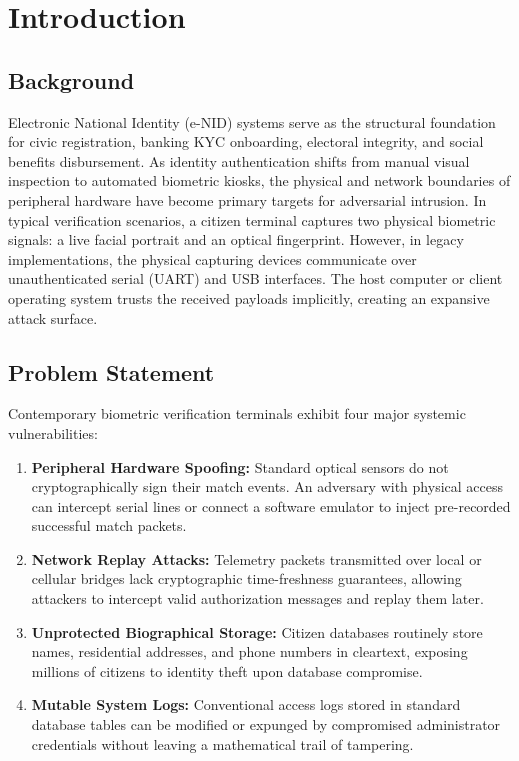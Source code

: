 \documentclass[11pt,a4paper]{article}
\begin{document}
\vspace{0.5cm}

\section{Introduction}

\subsection{Background}
Electronic National Identity (e-NID) systems serve as the structural foundation for civic registration, banking KYC onboarding, electoral integrity, and social benefits disbursement. As identity authentication shifts from manual visual inspection to automated biometric kiosks, the physical and network boundaries of peripheral hardware have become primary targets for adversarial intrusion. In typical verification scenarios, a citizen terminal captures two physical biometric signals: a live facial portrait and an optical fingerprint. However, in legacy implementations, the physical capturing devices communicate over unauthenticated serial (UART) and USB interfaces. The host computer or client operating system trusts the received payloads implicitly, creating an expansive attack surface.

\subsection{Problem Statement}
Contemporary biometric verification terminals exhibit four major systemic vulnerabilities:
\begin{enumerate}[label=\textbf{\arabic*.}]
    \item \textbf{Peripheral Hardware Spoofing:} Standard optical sensors do not cryptographically sign their match events. An adversary with physical access can intercept serial lines or connect a software emulator to inject pre-recorded successful match packets.
    \item \textbf{Network Replay Attacks:} Telemetry packets transmitted over local or cellular bridges lack cryptographic time-freshness guarantees, allowing attackers to intercept valid authorization messages and replay them later.
    \item \textbf{Unprotected Biographical Storage:} Citizen databases routinely store names, residential addresses, and phone numbers in cleartext, exposing millions of citizens to identity theft upon database compromise.
    \item \textbf{Mutable System Logs:} Conventional access logs stored in standard database tables can be modified or expunged by compromised administrator credentials without leaving a mathematical trail of tampering.
\end{enumerate}
\end{document}
